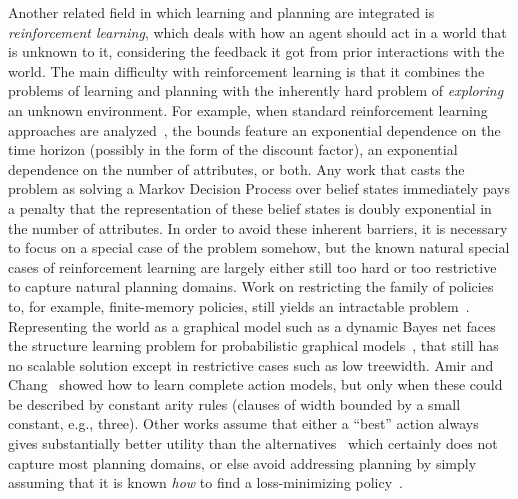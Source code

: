 \documentclass[12pt]{article}
\begin{document}
Another related field in which learning and planning are integrated is {\em reinforcement learning}, which deals with how an agent
should act in a world that is unknown to it, considering the feedback it got from prior interactions with the world. The main difficulty with reinforcement learning is that it combines the problems of learning and planning with the inherently hard problem of {\em exploring} an unknown environment. For example, when standard reinforcement learning approaches are analyzed~\cite{kearns2002POMDPsample,shani2005modelPOMDP}, the bounds feature an exponential dependence on the time horizon (possibly in the form of the discount factor), an exponential dependence on the number of attributes, or both. Any work that casts the problem as solving a Markov Decision Process over belief states immediately pays a penalty that the representation of these belief states is doubly exponential in the number of attributes.  In order to avoid these inherent barriers, it is necessary to focus on a special case of the problem somehow, but the known natural special cases of reinforcement learning are largely either still too hard or too restrictive to capture natural planning domains. Work on restricting the family of policies to, for example, finite-memory policies, still yields an intractable problem~\cite{meuleau1999finitestate}. Representing the world as a graphical model such as a dynamic Bayes net faces the structure learning problem for probabilistic graphical models~\cite[Section~19.4]{koller2009pgm}, that still has no scalable solution except in restrictive cases such as low treewidth. 
  Amir and Chang~\cite{amir2008} showed how to learn complete action models, but only when these could be described by constant arity rules (clauses of width bounded by a small constant, e.g., three).
  Other works assume that either a ``best'' action always gives substantially better utility than the alternatives~\cite{fern2006policyIteration} which certainly does not capture most planning domains, or else avoid addressing planning by simply assuming that it is known {\em how} to find a loss-minimizing policy~\cite{lazaric2010policyIteration}.


\end{document}
